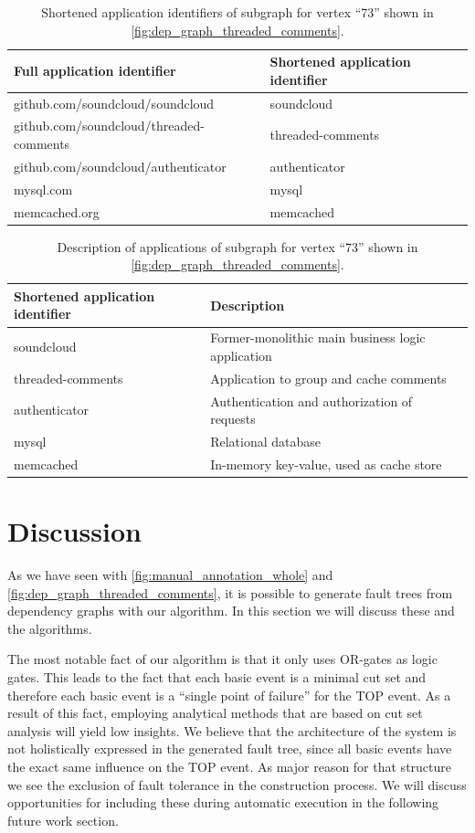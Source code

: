 \begin{table}
  \caption{Shortened application identifiers of subgraph for vertex ``73'' shown in \autoref{fig:dep_graph_threaded_comments}.}
  \label{tab:shortened_app_names}
  \begin{tabular}{ |l|l| }
    \hline
    Full application identifier & Shortened application identifier \\
    \hline
    github.com/soundcloud/soundcloud & soundcloud \\
    github.com/soundcloud/threaded-comments & threaded-comments \\
    github.com/soundcloud/authenticator & authenticator \\
    mysql.com & mysql \\
    memcached.org & memcached \\
    \hline
  \end{tabular}
\end{table}

\begin{table}
  \caption{Description of applications of subgraph for vertex ``73'' shown in \autoref{fig:dep_graph_threaded_comments}.}
  \label{tab:app_name_descriptions}
  \begin{tabular}{ |l|l| }
    \hline
    Shortened application identifier & Description\\
    \hline
    soundcloud & Former-monolithic main business logic application \\
    threaded-comments & Application to group and cache comments \\
    authenticator & Authentication and authorization of requests \\
    mysql & Relational database \\
    memcached & In-memory key-value, used as cache store \\
    \hline
  \end{tabular}
\end{table}

\section{Discussion}

As we have seen with \autoref{fig:manual_annotation_whole} and \autoref{fig:dep_graph_threaded_comments}, it is possible to generate fault trees from dependency graphs with our algorithm. In this section we will discuss these and the algorithms.

The most notable fact of our algorithm is that it only uses OR-gates as logic gates. This leads to the fact that each basic event is a minimal cut set and therefore each basic event is a ``single point of failure'' for the TOP event. As a result of this fact, employing analytical methods that are based on cut set analysis will yield low insights. We believe that the architecture of the system is not holistically expressed in the generated fault tree, since all basic events have the exact same influence on the TOP event. As major reason for that structure we see the exclusion of fault tolerance in the construction process. We will discuss opportunities for including these during automatic execution in the following future work section.

